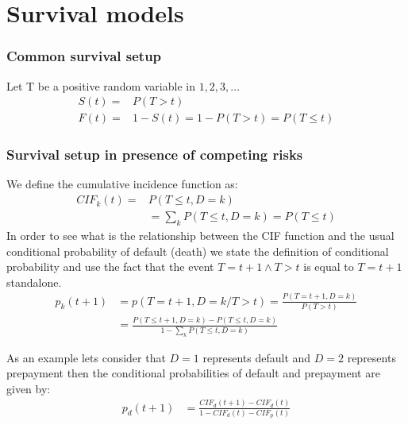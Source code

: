 \chapter{Survival models}
\subsection{Common survival setup}
Let T be a positive random variable in $1,2,3,...$
\begin{align}
    S(t)=&P(T>t) \\
    F(t)=&1-S(t)=1-P(T>t)=P(T\leq t)
\end{align}
\subsection{Survival setup in presence of competing risks}

We define the cumulative incidence function as:
\begin{align}
    CIF_k(t)=&P(T\leq t,D=k) \\
    &=\sum_k P(T \leq t,D=k) = P(T \leq t)
\end{align}
In order to see what is the relationship between the CIF function and the usual conditional probability of default (death) we state the definition of conditional probability and use the fact that the event $T=t+1 \wedge T>t$ is equal to $T=t+1$ standalone.
\begin{align}
    p_k(t+1)&=p(T=t+1,D=k/T>t)=\frac{P(T=t+1,D=k)}{P(T>t)}\\
    &= \frac{ P(T \leq t+1,D=k)-P(T\leq t,D=k)}{
    1-\sum_k P(T \leq t, D=k)
    }
\end{align}

As an example lets consider that $D=1$ represents default
and $D=2$ represents prepayment then the conditional probabilities of default and prepayment are given by:
\begin{align}
p_d(t+1)&= \frac{CIF_d(t+1)-CIF_d(t)  }{
1- CIF_d(t)-CIF_p(t)}  
\end{align}